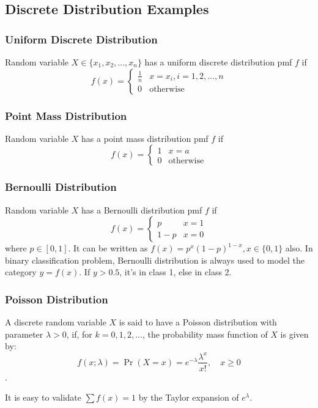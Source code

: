 \documentclass[11pt]{article}
\begin{document}
\subsection{Discrete Distribution Examples}
\subsubsection{Uniform Discrete Distribution}
Random variable $X \in \{x_1, x_2, ..., x_n\}$ has a uniform discrete distribution pmf $f$ if 
\[f(x) = \left\{\begin{array}{cc}
\frac{1}{n}  &  x = x_i, i = 1, 2, ..., n \\
0                &  \text{otherwise}
\end{array}
\right.\] 

\subsubsection{Point Mass Distribution}
Random variable $X$ has a point mass distribution pmf $f$ if 
\[f(x) = \left\{\begin{array}{cc}
1 & x= a \\
0 & \text{otherwise}
\end{array}
\right.
\]

\subsubsection{Bernoulli Distribution}
Random variable $X$ has a Bernoulli distribution pmf $f$ if 
\[f(x) = \left\{\begin{array}{cc}
p & x=1 \\
1-p & x=0
\end{array}
\right.
\]
where $p \in [0,1]$. It can be written as $f(x)=p^x(1-p)^{1-x},x\in\{0,1\}$ also. In binary classification problem, Bernoulli distribution is always used to model the category $y = f(x)$. If $y>0.5$, it's in class 1, else in class 2.

\subsubsection{Poisson Distribution}
A discrete random variable $X$ is said to have a Poisson distribution with parameter $\lambda > 0$, 
if, for $k = 0, 1, 2, ...$, the probability mass function of $X$ is given by:
\[f(x; \lambda) = \Pr(X=x)= e^{-\lambda} \frac{\lambda^x }{x!},\quad x\ge 0\].

It is easy to validate $\sum{f(x)}=1$ by the Taylor expansion of $e^\lambda$.
\end{document}
